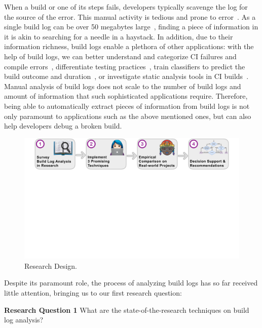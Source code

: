 When a build or one of its steps fails, developers typically
scavenge the log for the source of the error.
This manual activity is
tedious and prone to error~\cite{santolucito2018statically}.
As a
single build log can be over 50 megabytes large~\cite{beller2017oops},
finding a piece of information in it is akin to searching for a
needle in a haystack.
In addition, due to their information richness,
build logs enable a plethora of other applications: with the help of
build logs, we can better understand and categorize CI
failures and compile
errors~\cite{islam2017insights,seo2014programmers}, differentiate
testing practices~\cite{orellana2017differences,vassallo2017a-tale},
train classifiers to predict the build outcome and
duration~\cite{ni2017cost,bisong2017built,machalica2019predictive}, or
investigate static analysis tools in CI
builds~\cite{zampetti2017open}.
Manual analysis of build logs does not
scale to the number of build logs and amount of information that such
sophisticated applications require.
Therefore, being able to
automatically extract pieces of information from build logs
is not only paramount to applications such as the above mentioned
ones, but can also help
developers debug a broken build.

\begin{figure}[htb]
	\centering
	\includegraphics[width=\textwidth, trim={1.2cm 10.5cm 1.2cm 0cm},
	clip]{img/overview.pdf}
	\caption{Research Design.}
	\label{fig:overview}
\end{figure}

Despite its paramount role, the process of analyzing
build logs has so far received little attention, bringing us to our
first research question:
\begin{simplebox}[minipage boxed title*=-5cm]{\textbf{Research Question
1}}
What are the state-of-the-research techniques on build log analysis?
\end{simplebox}


